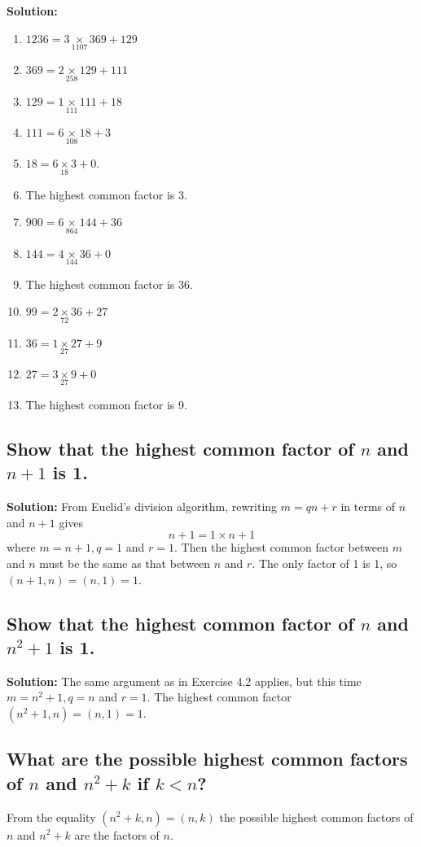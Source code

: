 \documentclass{article}
\newcommand{\exercise}[1]{\subsection{\normalfont #1}}
\newcommand{\solution}{\indent\indent \textbf{Solution: }}
\begin{document}
\solution
\begin{enumerate}
\item $1236 = 3\underset{1107}{\times} 369 + 129$
\item[] $369 = 2\underset{258}{\times} 129 + 111$ 
\item[] $129 = 1\underset{111}{\times} 111 + 18$ 
\item[] $111 = 6\underset{108}{\times} 18 + 3$ 
\item[] $ 18 = 6\underset{18}{\times} 3 + 0$. 
\item[] The highest common factor is 3.

\item $900 = 6\underset{864}{\times} 144 + 36$
\item[] $144 = 4\underset{144}{\times} 36 + 0$
\item[] The highest common factor is 36.

\item $99 = 2\underset{72}{\times} 36 + 27$
\item[] $36 = 1\underset{27}{\times} 27 + 9$
\item[] $27 = 3\underset{27}{\times} 9 + 0$
\item[] The highest common factor is 9.
\end{enumerate}

\exercise{Show that the highest common factor of $n$ and $n+1$ is 1.}
\solution
From Euclid's division algorithm, rewriting $m = qn + r$ in terms of $n$ and $n+1$ gives $$n+1 = 1\times n + 1$$ where $m=n+1, q=1$ and $r=1$. Then the highest common factor between $m$ and $n$ must be the same as that between $n$ and $r$. The only factor of 1 is 1, so $(n+1,n) = (n, 1) = 1$.

\exercise{Show that the highest common factor of $n$ and $n^2+1$ is 1.}
\solution
The same argument as in Exercise 4.2 applies, but this time $m=n^2+1, q=n$ and $r=1$. The highest common factor $(n^2+1, n) = (n, 1) = 1$.
\exercise{What are the possible highest common factors of $n$ and $n^2+k$ if $k<n$?}
From the equality $(n^2+k, n) = (n, k)$ the possible highest common factors of $n$ and $n^2+k$ are the factors of $n$. %

\newpage
\end{document}

